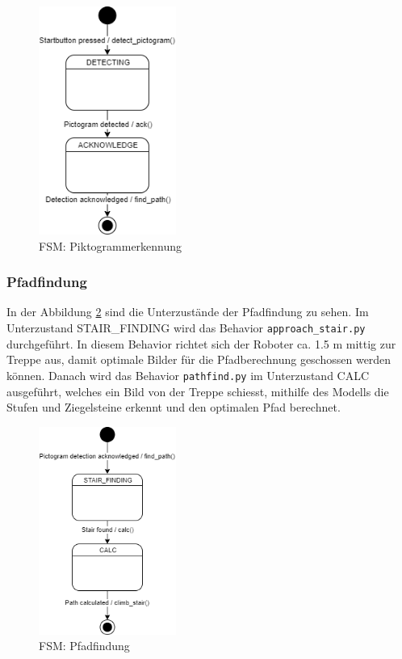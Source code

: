 \begin{figure}[H]
  \includegraphics[width=0.40\textwidth]{img/softwarearchitektur/FSM-PICTOGRAM_DETECTION.png}
  \centering
  \caption{FSM: Piktogrammerkennung}
  \label{fig:fsm-pictogrammdetection}
\end{figure}

\newpage

\subsubsection{Pfadfindung}
In der Abbildung \ref{fig:fsm-pathfinding} sind die Unterzustände der Pfadfindung zu sehen. Im Unterzustand STAIR\_FINDING wird das Behavior \texttt{approach\_stair.py} durchgeführt. In diesem Behavior richtet sich der Roboter ca. 1.5 m mittig zur Treppe aus, damit optimale Bilder für die Pfadberechnung geschossen werden können. Danach wird das Behavior \texttt{pathfind.py} im Unterzustand CALC ausgeführt, welches ein Bild von der Treppe schiesst, mithilfe des Modells die Stufen und Ziegelsteine erkennt und den optimalen Pfad berechnet.

\begin{figure}[H]
  \includegraphics[width=0.40\textwidth]{img/softwarearchitektur/FSM-PATH_FINDING.png}
  \centering
  \caption{FSM: Pfadfindung}
  \label{fig:fsm-pathfinding}
\end{figure}

